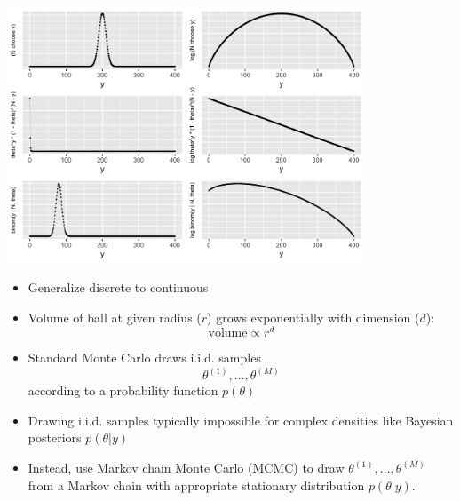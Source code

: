 \documentclass[10pt]{report}
\begin{document}
%
\\[-12pt]
\begin{center}
\includegraphics[width=0.8\textwidth]{img/binomial-concentration-400.png}
\end{center}


%
\begin{itemize}
\item Generalize discrete to continuous
\item Volume of ball at given radius ($r$) grows exponentially with
  dimension ($d$):
{\large
\[
\mbox{volume} \propto r^d
\]
}
\vspace*{-18pt}
\end{itemize}






%
\begin{itemize}
\item Standard Monte Carlo draws i.i.d. samples
\[
\theta^{(1)}, \ldots, \theta^{(M)}
\]
according to a probability function $p(\theta)$
\item Drawing i.i.d. samples typically impossible for
  complex densities like Bayesian posteriors $p(\theta|y)$
\item Instead, use Markov chain Monte Carlo (MCMC) to
  draw $\theta^{(1)}, \ldots, \theta^{(M)}$ from a Markov chain
  with appropriate stationary distribution $p(\theta | y)$.
\end{itemize}
\end{document}
